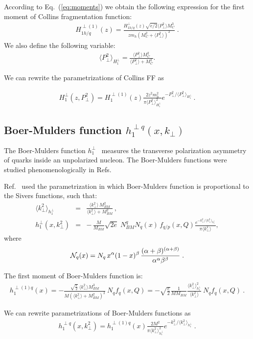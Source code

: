 \documentclass[a4paper,11pt]{article}
\newcommand{\ba}{\begin{eqnarray}}
\newcommand{\ea}{\end{eqnarray}}
\newcommand{\la}{\langle}
\newcommand{\ra}{\rangle}
\def\kperp{k_\perp}
\def\pperp{P_\perp}
\def\avkperp{\la \kperp^2 \ra}
\def\avpperp{\la \pperp^2 \ra}
\begin{document}
According to Eq.~(\ref{eq:moments}) we obtain the following expression for the first moment of 
Collins fragmentation function: 
\ba
H_{1 h/q}^{\perp (1)}(z) = \frac{H_{1 h/q}^{\perp}(z) \sqrt{e/2}  \avpperp M_C^3}{z m_h  (M_C^2+\avpperp)^2}\; .
\ea 
We also define the following variable:
\ba
\avpperp_{H_1^\perp} = \frac{\avpperp M_C^2 }{\avpperp + M_C^2} .  
\ea

We can rewrite the parametrizations of Collins FF as

\ba
H_{1}^{\perp}(z,\pperp^2) =  H_{1}^{\perp (1)}(z)   \frac{2 z^2 m_h^2}{\pi \avpperp_{H_{1}^\perp}^2} e^{-\pperp^2/{\avpperp_{H_{1}^\perp}}}
\label{coll-funct_new} \, .
\ea

\subsection{\boldmath Boer-Mulders function $h_{1}^{\perp q}(x,k_\perp)$} 
\label{App:basis-h1perp}

The Boer-Mulders function $h_{1}^{\perp}$~\cite{Boer:1997nt} measures 
the transverse polarization asymmetry of quarks inside an unpolarized 
nucleon. The Boer-Mulders functions were studied phenomenologically in 
Refs.~\cite{Barone:2009hw,Barone:2010gk,Barone:2015ksa}

Ref.~\cite{Barone:2010gk} used the parametrization in which Boer-Mulders function is proportional to the Sivers functions, such that:
\ba
\avkperp_{h_1^\perp} &=& \frac{\avkperp \, M^2_{BM}}{\avkperp + M^2_{BM}} \, , \\
h_{1}^{\perp}(x, \kperp^2) &= &
- \,\frac{M}{M_{BM}}  
\sqrt{2e}\; N_{BM}^q N_q (x)
\, f_{q/p} (x, Q)\frac{e^{-\kperp^2/\avkperp_{h_{1}^{\perp}}}}{\pi\avkperp},  
\label{BM-dist}
\ea
 where  
%
\ba
{\cal N}_q(x)= N_q \, x^{\alpha} (1-x)^{\beta} \,
\frac{(\alpha + \beta)^{(\alpha +\beta)}}
{\alpha^{\alpha} \beta^{\beta}}\; .
 \ea

The first moment of Boer-Mulders function is:
\ba
h_{1}^{\perp (1) q}(x)  = -\frac{\sqrt{\frac{e}{2}} \ \avkperp M_{BM}^3}{M (\avkperp + M_{BM}^2)^2}  \ {N}_q f_q(x, Q) = -\sqrt{\frac{e}{2}} \frac{1}{M M_{BM}}  \frac{\avkperp_{h_1^\perp}^2}{\avkperp}    \ {N}_q  f_q(x, Q)
\label{bm} \ .
\ea
 
We can rewrite parametrizations of Boer-Mulders functions as
\ba
h_{1}^{\perp q}(x,\kperp^2) =  h_{1}^{\perp (1) q}(x)   \frac{2 M^2}{\pi \avkperp_{h_{1}^\perp}^2} e^{-\kperp^2/{\avkperp_{h_{1}^\perp}}}\label{bm_new} \ .
\ea
 
\end{document}
